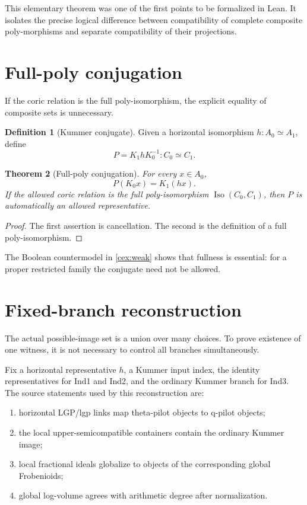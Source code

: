 \documentclass[11pt]{amsart}
\newtheorem{theorem}{Theorem}[section]
\theoremstyle{definition}
\newtheorem{definition}[theorem]{Definition}
\theoremstyle{remark}
\begin{document}
This elementary theorem was one of the first points to be formalized in Lean.
It isolates the precise logical difference between compatibility of complete
composite poly-morphisms and separate compatibility of their projections.

\section{Full-poly conjugation}

If the coric relation is the full poly-isomorphism, the explicit equality of
composite sets is unnecessary.

\begin{definition}[Kummer conjugate]
Given a horizontal isomorphism $h:A_0\simeq A_1$, define
\[
 P=K_1hK_0^{-1}:C_0\simeq C_1.
\]
\end{definition}

\begin{theorem}[Full-poly conjugation]\label{thm:conjugate}
For every $x\in A_0$,
\[
 P(K_0x)=K_1(hx).
\]
If the allowed coric relation is the full poly-isomorphism
$\operatorname{Iso}(C_0,C_1)$, then $P$ is automatically an allowed
representative.
\end{theorem}

\begin{proof}
The first assertion is cancellation.  The second is the definition of a full
poly-isomorphism.
\end{proof}

The Boolean countermodel in \cref{cex:weak} shows that fullness is essential:
for a proper restricted family the conjugate need not be allowed.

\section{Fixed-branch reconstruction}

The actual possible-image set is a union over many choices.  To prove
existence of one witness, it is not necessary to control all branches
simultaneously.

Fix a horizontal representative $h$, a Kummer input index, the identity
representatives for Ind1 and Ind2, and the ordinary Kummer branch for Ind3.
The source statements used by this reconstruction are:

\begin{enumerate}[label=(\roman*)]
\item horizontal LGP/lgp links map theta-pilot objects to q-pilot objects;
\item the local upper-semicompatible containers contain the ordinary Kummer
image;
\item local fractional ideals globalize to objects of the corresponding
global Frobenioids;
\item global log-volume agrees with arithmetic degree after normalization.
\end{enumerate}
\end{document}
